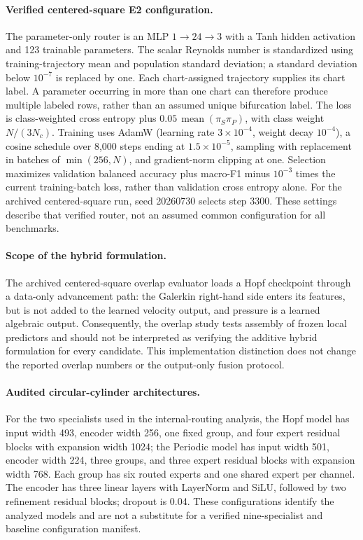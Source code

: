 \documentclass{article}
\providecommand{\DIFaddtex}[1]{{\protect\color{blue} \sf #1}} %
\providecommand{\DIFadd}[1]{\texorpdfstring{\DIFaddtex{#1}}{#1}} %
\begin{document}
\paragraph{\DIFadd{Verified centered-square E2 configuration.}}
\DIFadd{The parameter-only router is an MLP $1\to24\to3$ with a Tanh hidden activation and 123 trainable parameters. The scalar Reynolds number is standardized using training-trajectory mean and population standard deviation; a standard deviation below $10^{-7}$ is replaced by one. Each chart-assigned trajectory supplies its chart label. A parameter occurring in more than one chart can therefore produce multiple labeled rows, rather than an assumed unique bifurcation label. The loss is class-weighted cross entropy plus $0.05\,\operatorname{mean}(\pi_S\pi_P)$, with class weight $N/(3N_c)$. Training uses AdamW (learning rate $3\times10^{-4}$, weight decay $10^{-4}$), a cosine schedule over 8,000 steps ending at $1.5\times10^{-5}$, sampling with replacement in batches of $\min(256,N)$, and gradient-norm clipping at one. Selection maximizes validation balanced accuracy plus macro-F1 minus $10^{-3}$ times the current training-batch loss, rather than validation cross entropy alone. For the archived centered-square run, seed 20260730 selects step 3300. These settings describe that verified router, not an assumed common configuration for all benchmarks.
}

\paragraph{\DIFadd{Scope of the hybrid formulation.}}
\DIFadd{The archived centered-square overlap evaluator loads a Hopf checkpoint through a data-only advancement path: the Galerkin right-hand side enters its features, but is not added to the learned velocity output, and pressure is a learned algebraic output. Consequently, the overlap study tests assembly of frozen local predictors and should not be interpreted as verifying the additive hybrid formulation for every candidate. This implementation distinction does not change the reported overlap numbers or the output-only fusion protocol.
}

\paragraph{\DIFadd{Audited circular-cylinder architectures.}}
\DIFadd{For the two specialists used in the internal-routing analysis, the Hopf model has input width 493, encoder width 256, one fixed group, and four expert residual blocks with expansion width 1024; the Periodic model has input width 501, encoder width 224, three groups, and three expert residual blocks with expansion width 768. Each group has six routed experts and one shared expert per channel. The encoder has three linear layers with LayerNorm and SiLU, followed by two refinement residual blocks; dropout is 0.04. These configurations identify the analyzed models and are not a substitute for a verified nine-specialist and baseline configuration manifest.
}
\end{document}
